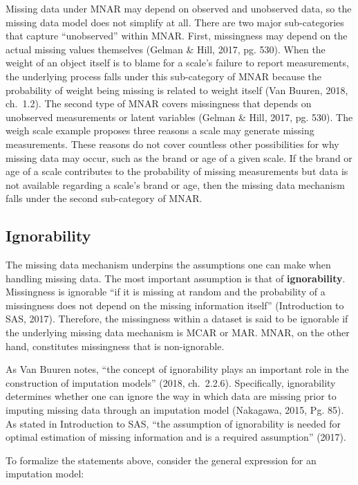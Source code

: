 \documentclass[12pt,oneside]{chicagocapstone}
\begin{document}
Missing data under MNAR may depend on observed and unobserved data, so
the missing data model does not simplify at all. There are two major
sub-categories that capture ``unobserved'' within MNAR. First,
missingness may depend on the actual missing values themselves (Gelman
\& Hill, 2017, pg. 530). When the weight of an object itself is to blame
for a scale's failure to report measurements, the underlying process
falls under this sub-category of MNAR because the probability of weight
being missing is related to weight itself (Van Buuren, 2018, ch.~1.2).
The second type of MNAR covers missingness that depends on unobserved
measurements or latent variables (Gelman \& Hill, 2017, pg. 530). The
weigh scale example proposes three reasons a scale may generate missing
measurements. These reasons do not cover countless other possibilities
for why missing data may occur, such as the brand or age of a given
scale. If the brand or age of a scale contributes to the probability of
missing measurements but data is not available regarding a scale's brand
or age, then the missing data mechanism falls under the second
sub-category of MNAR.

\subsection*{Ignorability}\label{background-ignorability}

The missing data mechanism underpins the assumptions one can make when
handling missing data. The most important assumption is that of
\textbf{ignorability}. Missingness is ignorable ``if it is missing at
random and the probability of a missingness does not depend on the
missing information itself'' (Introduction to SAS, 2017). Therefore, the
missingness within a dataset is said to be ignorable if the underlying
missing data mechanism is MCAR or MAR. MNAR, on the other hand,
constitutes missingness that is non-ignorable.

As Van Buuren notes, ``the concept of ignorability plays an important
role in the construction of imputation models'' (2018, ch.~2.2.6).
Specifically, ignorability determines whether one can ignore the way in
which data are missing prior to imputing missing data through an
imputation model (Nakagawa, 2015, Pg. 85). As stated in Introduction to
SAS, ``the assumption of ignorability is needed for optimal estimation
of missing information and is a required assumption'' (2017).

To formalize the statements above, consider the general expression for
an imputation model:
\end{document}
